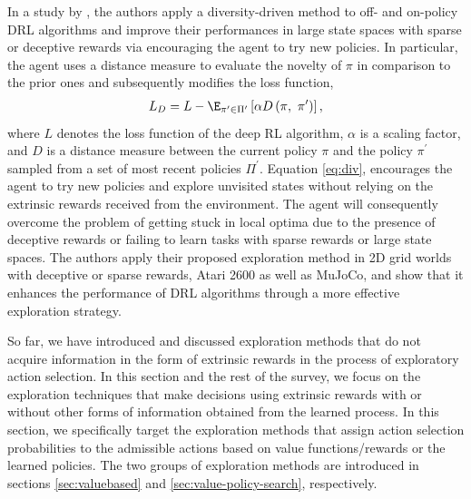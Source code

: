 In a study by , the authors apply a diversity-driven method to off- and on-policy DRL algorithms and improve their performances in large state spaces with sparse or deceptive rewards via encouraging the agent to try new policies. In particular, the agent uses a distance measure to evaluate the novelty of $\pi$ in comparison to the prior ones and subsequently modifies the loss function,
\begin{align}
L_D = L - \E_{\pi^{\prime}\in\Pi^{\prime}}\left[\alpha D\left(\pi,~\pi^{\prime}\right)\right], \label{eq:div}
\end{align}
where $L$ denotes the loss function of the deep RL algorithm, $\alpha$ is a scaling factor, and $D$ is a distance measure between the current policy $\pi$ and the policy $\pi^{\prime}$ sampled from a set of most recent policies $\Pi^{\prime}$. Equation \ref{eq:div}, encourages the agent to try new policies and explore unvisited states without relying on the extrinsic rewards received from the environment. The agent will consequently overcome the problem of getting stuck in local optima due to the presence of deceptive rewards or failing to learn tasks with sparse rewards or large state spaces. The authors apply their proposed exploration method in 2D grid worlds with deceptive or sparse rewards, Atari 2600 as well as MuJoCo, and show that it enhances the performance of DRL algorithms through a more effective exploration strategy.

\label{sec:stochastic}
So far, we have introduced and discussed exploration methods that do not acquire information in the form of extrinsic rewards in the process of exploratory action selection. In this section and the rest of the survey, we focus on the exploration techniques that make decisions using extrinsic rewards with or without other forms of information obtained from the learned process. In this section, we specifically target the exploration methods that assign action selection probabilities to the admissible actions based on value functions/rewards or the learned policies. The two groups of exploration methods are introduced in sections \ref{sec:valuebased} and \ref{sec:value-policy-search}, respectively.

